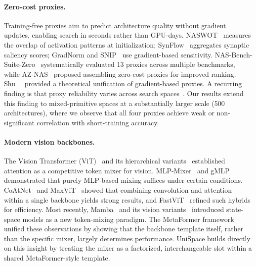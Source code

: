 \documentclass[10pt,twocolumn,letterpaper]{article}
\newcommand{\method}{UniSpace\xspace}
\newcommand{\naswot}{NASWOT\xspace}
\begin{document}
\paragraph{Zero-cost proxies.}
Training-free proxies aim to predict architecture quality without gradient updates, enabling search in seconds rather than GPU-days. 
\naswot~\cite{mellor2021naswot} measures the overlap of activation patterns at initialization; SynFlow~\cite{tanaka2020synflow} aggregates synaptic saliency scores; GradNorm and SNIP~\cite{abdelfattah2021zerocost} use gradient-based sensitivity. 
NAS-Bench-Suite-Zero~\cite{krishnakumar2022nasbenchsuitezero} systematically evaluated 13 proxies across multiple benchmarks, while AZ-NAS~\cite{lee2024aznas} proposed assembling zero-cost proxies for improved ranking. 
Shu~\etal~\cite{shu2022unifying} provided a theoretical unification of gradient-based proxies. 
A recurring finding is that proxy reliability varies across search spaces~\cite{abdelfattah2021zerocost,krishnakumar2022nasbenchsuitezero}. 
Our results extend this finding to mixed-primitive spaces at a substantially larger scale (500 architectures), where we observe that all four proxies achieve weak or non-significant correlation with short-training accuracy.

\paragraph{Modern vision backbones.}
The Vision Transformer (ViT)~\cite{dosovitskiy2021image} and its hierarchical variants~\cite{liu2021swin,touvron2021training} established attention as a competitive token mixer for vision. 
MLP-Mixer~\cite{tolstikhin2021mlpmixer} and gMLP~\cite{liu2021gmlp} demonstrated that purely MLP-based mixing suffices under certain conditions. 
CoAtNet~\cite{dai2021coatnet} and MaxViT~\cite{tu2022maxvit} showed that combining convolution and attention within a single backbone yields strong results, and FastViT~\cite{vasu2023fastvit} refined such hybrids for efficiency. 
Most recently, Mamba~\cite{gu2023mamba} and its vision variants~\cite{zhu2024vim,liu2024vmamba} introduced state-space models as a new token-mixing paradigm. 
The MetaFormer framework~\cite{yu2022metaformer} unified these observations by showing that the backbone template itself, rather than the specific mixer, largely determines performance. 
\method builds directly on this insight by treating the mixer as a factorized, interchangeable slot within a shared MetaFormer-style template.

\end{document}
